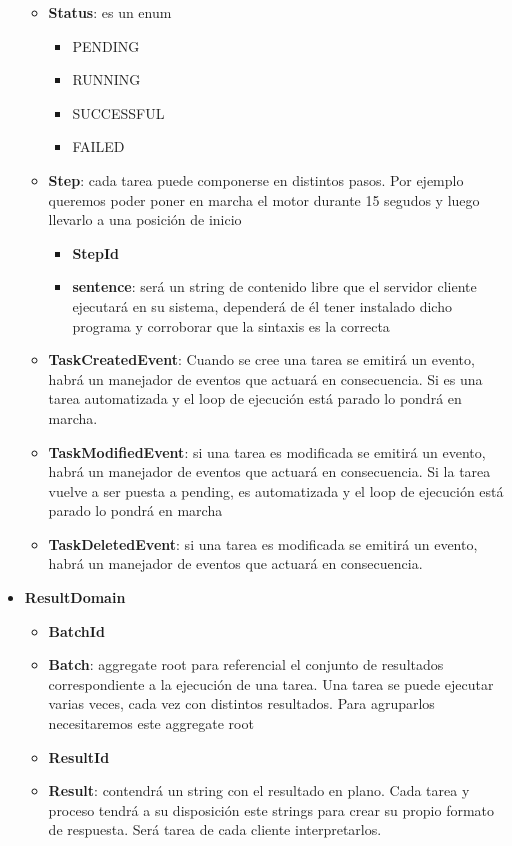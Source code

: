 \begin{itemize}
\begin{itemize}
        \item \textbf{Status}: es un enum \label{taskStatus}
        \begin{itemize}
            \item PENDING
            \item RUNNING
            \item SUCCESSFUL
            \item FAILED
        \end{itemize}
        \item \textbf{Step}: cada tarea puede componerse en distintos pasos. Por ejemplo queremos poder poner en marcha el motor durante 15 segudos y luego llevarlo a una posición de inicio
        \begin{itemize}
            \item \textbf{StepId}
            \item \textbf{sentence}: será un string de contenido libre que el servidor cliente ejecutará en su sistema, dependerá de él tener instalado dicho programa y corroborar que la sintaxis es la correcta
        \end{itemize}
        \item \textbf{TaskCreatedEvent}: Cuando se cree una tarea se emitirá un evento, habrá un manejador de eventos que actuará en consecuencia. Si es una tarea automatizada y el loop de ejecución está parado lo pondrá en marcha.
        \item \textbf{TaskModifiedEvent}: si una tarea es modificada se emitirá un evento, habrá un manejador de eventos que actuará en consecuencia. Si la tarea vuelve a ser puesta a pending, es automatizada y el loop de ejecución está parado lo pondrá en marcha
        \item \textbf{TaskDeletedEvent}: si una tarea es modificada se emitirá un evento, habrá un manejador de eventos que actuará en consecuencia.
    \end{itemize}
    \item \textbf{ResultDomain}
        \begin{itemize}
            \item \textbf{BatchId}
            \item \textbf{Batch}: aggregate root para referencial el conjunto de resultados correspondiente a la ejecución de una tarea. Una tarea se puede ejecutar varias veces, cada vez con distintos resultados. Para agruparlos necesitaremos este aggregate root
            \item \textbf{ResultId}
            \item \textbf{Result}: contendrá un string con el resultado en plano. Cada tarea y proceso tendrá a su disposición este strings para crear su propio formato de respuesta. Será tarea de cada cliente interpretarlos.
        \end{itemize}
\end{itemize}

